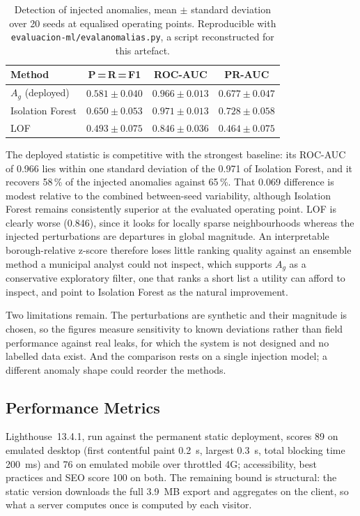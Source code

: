 \documentclass[runningheads]{llncs}
\newif\ifmarcarcambios
\newcommand{\icokg}[1]{\ifmarcarcambios\textcolor{nuevo}{#1}\else#1\fi}
\renewcommand{\_}{\origunderscore\allowbreak}
\begin{document}
\begin{table}[tbp]
\centering
\caption{\icokg{Detection of injected anomalies, mean $\pm$ standard deviation over 20 seeds at equalised operating points. Reproducible with \texttt{evaluacion-ml/eval\_anomalias.py}, a script reconstructed for this artefact.}}
\label{tab:eval_ml}
\begin{tabular}{@{}lccc@{}}
\hline
\textbf{Method} & \textbf{P\,=\,R\,=\,F1} & \textbf{ROC-AUC} & \textbf{PR-AUC} \\
\hline
$A_g$ (deployed) & $0.581\pm0.040$ & $0.966\pm0.013$ & $0.677\pm0.047$ \\
Isolation Forest & $0.650\pm0.053$ & $0.971\pm0.013$ & $0.728\pm0.058$ \\
LOF & $0.493\pm0.075$ & $0.846\pm0.036$ & $0.464\pm0.075$ \\
\hline
\end{tabular}
\end{table}

\icokg{The deployed statistic is competitive with the strongest baseline: its
ROC-AUC of 0.966 lies within one standard deviation of the 0.971 of Isolation
Forest, and it recovers 58\,\% of the injected anomalies against 65\,\%. That
0.069 difference is modest relative to the combined between-seed variability,
although Isolation Forest remains consistently superior at the evaluated
operating point. LOF is clearly worse (0.846), since
it looks for locally sparse neighbourhoods whereas the injected perturbations are
departures in global magnitude. An interpretable borough-relative z-score therefore
loses little ranking quality against an ensemble method a municipal analyst could
not inspect, which supports $A_g$ as a conservative exploratory filter, one that ranks a short list a utility can afford to inspect, and point to Isolation Forest as the natural improvement.}

\icokg{Two limitations remain. The perturbations are synthetic and their magnitude
is chosen, so the figures measure sensitivity to known deviations rather than
field performance against real leaks, for which the system is not designed and no
labelled data exist. And the comparison rests on a single injection model; a
different anomaly shape could reorder the methods.}

\subsection{Performance Metrics}

\icokg{Lighthouse~13.4.1, run against the permanent static deployment, scores 89
on emulated desktop (first contentful paint 0.2~s, largest 0.3~s, total blocking
time 200~ms) and 76 on emulated mobile over throttled 4G; accessibility, best
practices and SEO score 100 on both. The remaining bound is structural: the
static version downloads the full 3.9~MB export and aggregates on the client, so
what a server computes once is computed by each visitor.}
\end{document}
